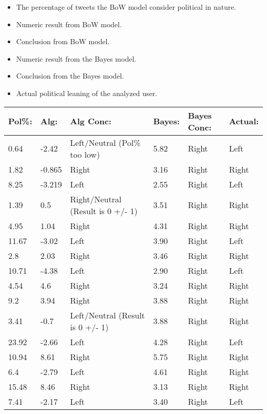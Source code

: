 \begin{itemize}
  \item The percentage of tweets the BoW model
consider political in nature.
\item Numeric result from BoW model.
\item Conclusion from BoW model.
\item Numeric result from the Bayes model.
\item Conclusion from the Bayes model.
\item Actual political leaning of the analyzed user.
\end{itemize}

\begin{table}[H]\centering
\begin{tabular}{|l|l|l|l|l|l|}
\hline
\textbf{Pol\%:}	&	\textbf{Alg:}	&	\textbf{Alg Conc:}							&	\textbf{Bayes:}	&
\textbf{Bayes Conc:}
& \textbf{Actual:}
\\\hline 0.64	&	-2.42	&	Left/Neutral (Pol\% too low)		&	5.82	&	Right		&	Left	\\\hline
1.82	&	-0.865	&	Right								&	3.16	&	Right		&	Right	\\\hline
8.25	&	-3.219	&	Left								&	2.55	&	Right		&	Left	\\\hline
1.39	&	0.5		&	Right/Neutral (Result is 0 +/- 1)	&	3.51	&	Right		&	Right	\\\hline
4.95	&	1.04	&	Right								&	4.31	&	Right		&	Right	\\\hline
11.67	&	-3.02	&	Left								&	3.90	&	Right		&	Left	\\\hline
2.8		&	2.03	&	Right								&	3.46	&	Right		&	Right	\\\hline
10.71	&	-4.38	&	Left								&	2.90	&	Right		&	Left	\\\hline
4.54	&	4.6		&	Right								&	3.24	&	Right		&	Right	\\\hline
9.2		&	3.94	&	Right								&	3.88	&	Right		&	Right	\\\hline
3.41	&	-0.7	&	Left/Neutral (Result is 0 +/- 1)	&	3.88	&	Right		&	Right	\\\hline
23.92	&	-2.66	&	Left								&	4.28	&	Right		&	Left	\\\hline
10.94	&	8.61	&	Right								&	5.75	&	Right		&	Right	\\\hline
6.4		&	-2.79	&	Left								&	4.61	&	Right		&	Right	\\\hline
15.48	&	8.46	&	Right								&	3.13	&	Right		&	Right	\\\hline
7.41	&	-2.17	&	Left								&	3.40	&	Right		&	Left	\\\hline

\end{tabular}
\end{table}
